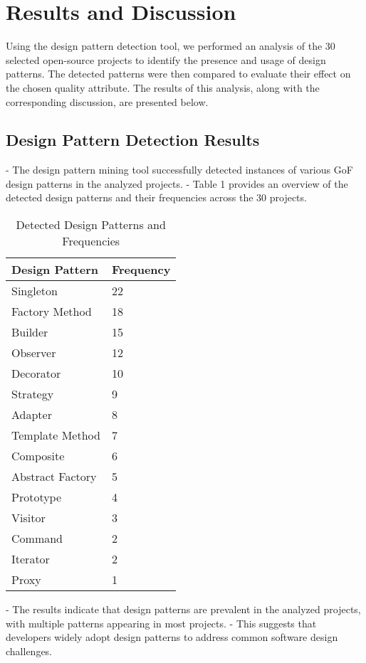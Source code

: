 \documentclass[conference]{IEEEtran}
\begin{document}
	\section{Results and Discussion}	
	Using the design pattern detection tool, we performed an analysis of the 30 selected open-source projects to identify the presence and usage of design patterns. The detected patterns were then compared to evaluate their effect on the chosen quality attribute. The results of this analysis, along with the corresponding discussion, are presented below.
	
	\subsection{Design Pattern Detection Results} 
	- The design pattern mining tool successfully detected instances of various GoF design patterns in the analyzed projects.
	- Table 1 provides an overview of the detected design patterns and their frequencies across the 30 projects.
	
	\setlength{\tabcolsep}{18pt}
	\renewcommand{\arraystretch}{1.5}
	\begin{table} [h!]
		\begin{tabular}{ |p{3cm}| p{3cm}| }
			\hline
			Design Pattern & Frequency \\
			\hline
			Singleton & 22 \\
			Factory Method & 18	\\
			Builder & 15 \\
			Observer & 12 \\
			Decorator &10 \\
			Strategy & 9 \\
			Adapter & 8 \\
			Template Method & 7 \\
			Composite & 6 \\
			Abstract Factory & 5 \\
			Prototype & 4 \\
			Visitor & 3 \\
			Command & 2  \\
			Iterator & 2 \\
			Proxy & 1 \\
			\hline
		\end{tabular}
		\caption {Detected Design Patterns and Frequencies}
		\label {table:1}
	\end{table}
	
	- The results indicate that design patterns are prevalent in the analyzed projects, with multiple patterns appearing in most projects.
	- This suggests that developers widely adopt design patterns to address common software design challenges.
	
\end{document}
